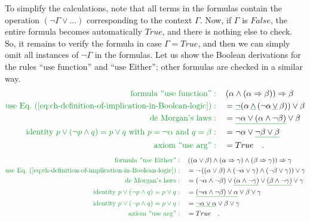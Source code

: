 To simplify the calculations, note that all terms in the formulas
contain the operation $\left(\neg\Gamma\vee...\right)$ corresponding
to the context $\Gamma$. Now, if $\Gamma$ is $False$, the entire
formula becomes automatically $True$, and there is nothing else to
check. So, it remains to verify the formula in case $\Gamma=True$,
and then we can simply omit all instances of $\neg\Gamma$ in the
formulas. Let us show the Boolean derivations for the rules \textsf{``}$\text{use function}$\textsf{''}
and \textsf{``}$\text{use Either}$\textsf{''}; other formulas are checked in a similar
way. 
\begin{align*}
{\color{greenunder}\text{formula \textsf{``}use function\textsf{''}}:}\quad & \left(\alpha\wedge\left(\alpha\Rightarrow\beta\right)\right)\Rightarrow\beta\\
{\color{greenunder}\text{use Eq.~(\ref{eq:ch-definition-of-implication-in-Boolean-logic})}:}\quad & =\gunderline{\neg}(\alpha\,\gunderline{\wedge}\,(\neg\alpha\,\gunderline{\vee}\,\beta))\vee\beta\\
{\color{greenunder}\text{de Morgan\textsf{'}s laws}:}\quad & =\gunderline{\neg\alpha\vee(\alpha\wedge\neg\beta)}\vee\beta\\
{\color{greenunder}\text{identity }p\vee(\neg p\wedge q)=p\vee q\text{ with }p=\neg\alpha\text{ and }q=\beta:}\quad & =\neg\alpha\vee\gunderline{\neg\beta\vee\beta}\\
{\color{greenunder}\text{axiom \textsf{``}use arg\textsf{''}}:}\quad & =True\quad.
\end{align*}
\begin{align*}
{\color{greenunder}\text{formula \textsf{``}use Either\textsf{''}}:}\quad & \left(\left(\alpha\vee\beta\right)\wedge\left(\alpha\Rightarrow\gamma\right)\wedge\left(\beta\Rightarrow\gamma\right)\right)\Rightarrow\gamma\\
{\color{greenunder}\text{use Eq.~(\ref{eq:ch-definition-of-implication-in-Boolean-logic})}:}\quad & =\neg\left(\left(\alpha\vee\beta\right)\wedge\left(\neg\alpha\vee\gamma\right)\wedge\left(\neg\beta\vee\gamma\right)\right)\vee\gamma\\
{\color{greenunder}\text{de Morgan\textsf{'}s laws}:}\quad & =\left(\neg\alpha\wedge\neg\beta\right)\vee\gunderline{\left(\alpha\wedge\neg\gamma\right)}\vee\gunderline{\left(\beta\wedge\neg\gamma\right)}\vee\gamma\\
{\color{greenunder}\text{identity }p\vee(\neg p\wedge q)=p\vee q:}\quad & =\gunderline{\left(\neg\alpha\wedge\neg\beta\right)\vee\alpha}\vee\beta\vee\gamma\\
{\color{greenunder}\text{identity }p\vee(\neg p\wedge q)=p\vee q:}\quad & =\gunderline{\neg\alpha\vee\alpha}\vee\beta\vee\gamma\\
{\color{greenunder}\text{axiom \textsf{``}use arg\textsf{''}}:}\quad & =True\quad.
\end{align*}
